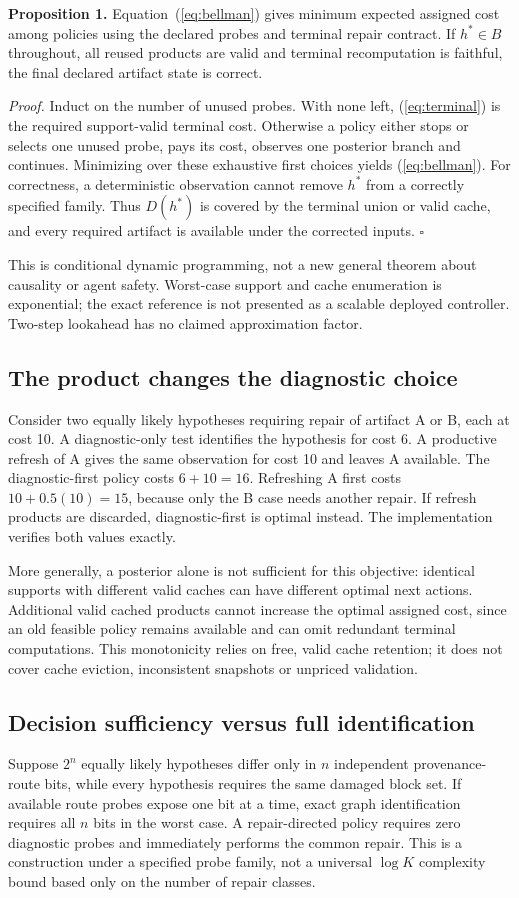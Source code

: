 \documentclass[10pt,letterpaper]{article}
\begin{document}
\textbf{Proposition 1.} Equation~(\ref{eq:bellman}) gives minimum expected assigned cost among policies using the declared probes and terminal repair contract. If $h^*\in B$ throughout, all reused products are valid and terminal recomputation is faithful, the final declared artifact state is correct.

\emph{Proof.} Induct on the number of unused probes. With none left, (\ref{eq:terminal}) is the required support-valid terminal cost. Otherwise a policy either stops or selects one unused probe, pays its cost, observes one posterior branch and continues. Minimizing over these exhaustive first choices yields (\ref{eq:bellman}). For correctness, a deterministic observation cannot remove $h^*$ from a correctly specified family. Thus $D(h^*)$ is covered by the terminal union or valid cache, and every required artifact is available under the corrected inputs. $\square$

This is conditional dynamic programming, not a new general theorem about causality or agent safety. Worst-case support and cache enumeration is exponential; the exact reference is not presented as a scalable deployed controller. Two-step lookahead has no claimed approximation factor.

\subsection{The product changes the diagnostic choice}
Consider two equally likely hypotheses requiring repair of artifact A or B, each at cost 10. A diagnostic-only test identifies the hypothesis for cost 6. A productive refresh of A gives the same observation for cost 10 and leaves A available. The diagnostic-first policy costs $6+10=16$. Refreshing A first costs $10+0.5(10)=15$, because only the B case needs another repair. If refresh products are discarded, diagnostic-first is optimal instead. The implementation verifies both values exactly.

More generally, a posterior alone is not sufficient for this objective: identical supports with different valid caches can have different optimal next actions. Additional valid cached products cannot increase the optimal assigned cost, since an old feasible policy remains available and can omit redundant terminal computations. This monotonicity relies on free, valid cache retention; it does not cover cache eviction, inconsistent snapshots or unpriced validation.

\subsection{Decision sufficiency versus full identification}
Suppose $2^n$ equally likely hypotheses differ only in $n$ independent provenance-route bits, while every hypothesis requires the same damaged block set. If available route probes expose one bit at a time, exact graph identification requires all $n$ bits in the worst case. A repair-directed policy requires zero diagnostic probes and immediately performs the common repair. This is a construction under a specified probe family, not a universal $\log K$ complexity bound based only on the number of repair classes.
\end{document}
